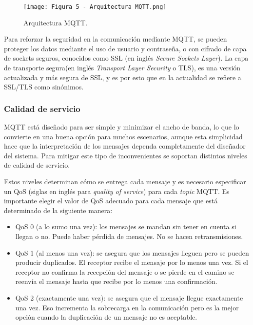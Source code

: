 \begin{figure}[h]
\centering
\texttt{[image: Figura 5 - Arquitectura MQTT.png]}
\caption[Arquitectura MQTT]{Arquitectura MQTT. \footnotemark}
\label{fig:6}
\end{figure}

Para reforzar la seguridad en la comunicación mediante MQTT, se pueden proteger los datos mediante el uso de usuario y contraseña, o con cifrado de capa de sockets seguros, conocidos como SSL (en inglés \textit{Secure Sockets Layer}). La capa de transporte segura(en inglés \textit{Transport Layer Security} o TLS), es una versión actualizada y más segura de SSL, y es por esto que en la actualidad se refiere a SSL/TLS como sinónimos.

\subsubsection{Calidad de servicio}

MQTT está diseñado para ser simple y minimizar el ancho de banda, lo que lo convierte en una buena opción para muchos escenarios, aunque esta simplicidad hace que la interpretación de los mensajes dependa completamente del diseñador del sistema. Para mitigar este tipo de inconvenientes se soportan distintos niveles de calidad de servicio.

Estos niveles determinan cómo se entrega cada mensaje y es necesario especificar un QoS (siglas en inglés para \textit{quality of service}) para cada \textit{topic} MQTT. Es importante elegir el valor de QoS adecuado para cada mensaje que está determinado de la siguiente manera:

\begin{itemize}
	\item QoS 0 (a lo sumo una vez): los mensajes se mandan sin tener en cuenta si llegan o no. Puede haber pérdida de mensajes. No se hacen retransmisiones.
	\item QoS 1 (al menos una vez): se asegura que los mensajes lleguen pero se pueden producir duplicados. El receptor recibe el mensaje por lo menos una vez. Si el receptor no confirma la recepción del mensaje o se pierde en el camino se reenvía el mensaje hasta que recibe por lo menos una confirmación.
	\item QoS 2 (exactamente una vez): se asegura que el mensaje llegue exactamente una vez. Eso incrementa la sobrecarga en la comunicación pero es la mejor opción cuando la duplicación de un mensaje no es aceptable.
\end{itemize}

